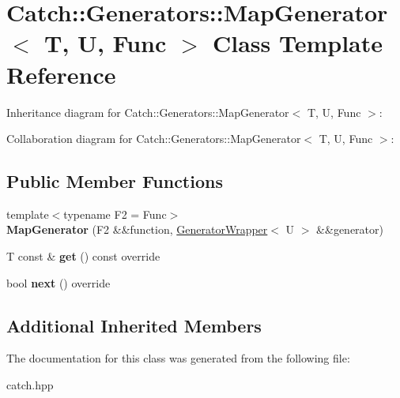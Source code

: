 \hypertarget{classCatch_1_1Generators_1_1MapGenerator}{}\section{Catch\+:\+:Generators\+:\+:Map\+Generator$<$ T, U, Func $>$ Class Template Reference}
\label{classCatch_1_1Generators_1_1MapGenerator}


Inheritance diagram for Catch\+:\+:Generators\+:\+:Map\+Generator$<$ T, U, Func $>$\+:


Collaboration diagram for Catch\+:\+:Generators\+:\+:Map\+Generator$<$ T, U, Func $>$\+:
\subsection*{Public Member Functions}
\begin{DoxyCompactItemize}
\item 
\mbox{\label{classCatch_1_1Generators_1_1MapGenerator_a525c7eaf53ad220ee7add534aff2522c}} 
{\footnotesize template$<$typename F2  = Func$>$ }\\{\bfseries Map\+Generator} (F2 \&\&function, \hyperlink{classCatch_1_1Generators_1_1GeneratorWrapper}{Generator\+Wrapper}$<$ U $>$ \&\&generator)
\item 
\mbox{\label{classCatch_1_1Generators_1_1MapGenerator_a199d377afba00519f202c59b4b488235}} 
T const  \& {\bfseries get} () const override
\item 
\mbox{\label{classCatch_1_1Generators_1_1MapGenerator_aa07e2f12d38ae060c30cc30d9dc236c5}} 
bool {\bfseries next} () override
\end{DoxyCompactItemize}
\subsection*{Additional Inherited Members}


The documentation for this class was generated from the following file\+:\begin{DoxyCompactItemize}
\item 
catch.\+hpp\end{DoxyCompactItemize}
